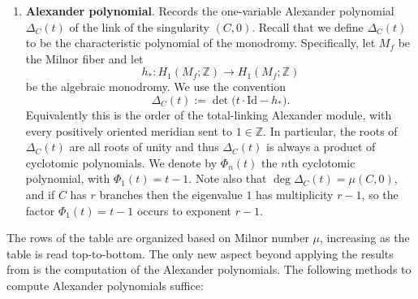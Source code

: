 \begin{enumerate}
    \item {\bf Alexander polynomial}. Records the one-variable Alexander polynomial $\Delta_{C}(t)$ of the link of the singularity $(C,0)$. Recall that we define $\Delta_{C}(t)$ to be the characteristic polynomial of the monodromy. Specifically, let $M_f$ be the Milnor fiber and let
\[
h_*\colon H_1(M_f;\mathbb Z)\longrightarrow H_1(M_f;\mathbb Z)
\]
be the algebraic monodromy.  We use the convention
\begin{equation}\label{eq:DeltaConvention}
 \Delta_C(t):=\det\!\bigl(t\cdot\mbox{Id}-h_*\bigr).
\end{equation}
Equivalently this is the order of the total-linking Alexander module, with every positively oriented meridian sent to $1\in\mathbb Z$. In particular, the roots of $\Delta_C(t)$ are all roots of unity and thus $\Delta_{C}(t)$ is always a product of cyclotomic polynomials. We denote by $\Phi_n(t)$ the $n$th cyclotomic polynomial, with $\Phi_1(t)=t-1$. Note also that $\deg \Delta_C(t)=\mu(C,0)$, and if $C$ has $r$ branches then the eigenvalue $1$ has multiplicity $r-1$, so the factor $\Phi_1(t)=t-1$ occurs to exponent $r-1$.\\
\end{enumerate}

\noindent The rows of the table are organized based on Milnor number $\mu$, increasing as the table is read top-to-bottom. The only new aspect beyond applying the results from \cite{Arnold1976} is the computation of the Alexander polynomials. The following methods to compute Alexander polynomials suffice:

